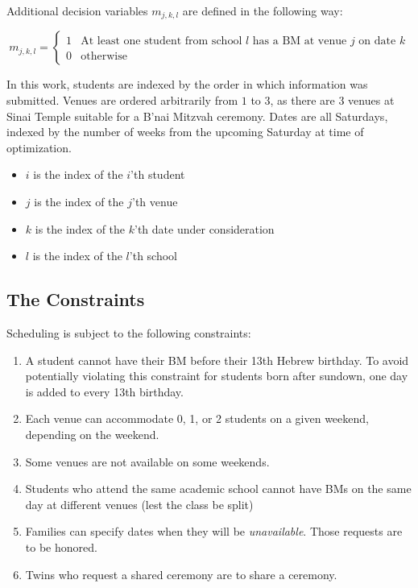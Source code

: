 \documentclass[11pt]{article}
\begin{document}
Additional decision variables $m_{j,k,l}$ are defined in the following way:

\begin{equation}\label{m}
m_{j,k,l}=
\begin{cases}
      1 & \text{At least one student from school $l$ has a BM at venue $j$ on date $k$} \\
      0 & \text{otherwise}
   \end{cases}
\end{equation}

In this work, students are indexed by the order in which information was submitted. Venues are ordered arbitrarily from $1$ to $3$, as there are $3$ venues at Sinai Temple suitable for a B'nai Mitzvah ceremony. Dates are all Saturdays, indexed by the number of weeks from the upcoming Saturday at time of optimization.

\begin{itemize}
\item $i$ is the index of the $i$'th student
\item $j$ is the index of the $j$'th venue
\item $k$ is the index of the $k$'th date under consideration
\item $l$ is the index of the $l$'th school
\end{itemize}




\subsection{The Constraints}

Scheduling is subject to the following constraints:

\begin{enumerate}
\item A student cannot have their BM before their 13th Hebrew birthday. To avoid potentially violating this constraint for students born after sundown, one day is added to every 13th birthday.
\item Each venue can accommodate 0, 1, or 2 students on a given weekend, depending on the weekend.
\item Some venues are not available on some weekends.
\item Students who attend the same academic school cannot have BMs on the same day at different venues (lest the class be split)
\item Families can specify dates when they will be \emph{unavailable}. Those requests are to be honored.
\item Twins who request a shared ceremony are to share a ceremony.
\end{enumerate}
\end{document}
